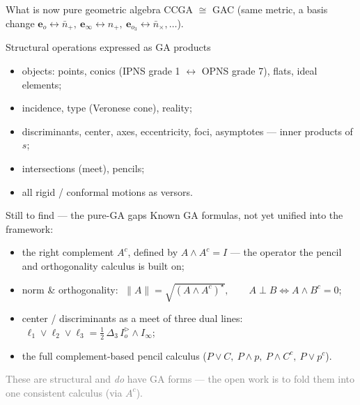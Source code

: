 \documentclass[aspectratio=169, 10pt]{beamer}
\newcommand{\eo}{\mathbf{e}_o}
\newcommand{\einff}{\mathbf{e}_\infty}
\newcommand{\eoi}[1]{\mathbf{e}_{o_{#1}}}
\newcommand{\Iod}{I_o^{\triangleright}}
\newcommand{\Iinf}{I_\infty}
\newcommand{\wed}{\wedge}
\newcommand{\meet}{\vee}
\begin{document}
\begin{frame}[t]{What is now pure geometric algebra}
  CCGA $\cong$ GAC (same metric, a basis change
  $\eo\!\leftrightarrow\!\bar n_+,\ \einff\!\leftrightarrow\! n_+,\ \eoi3\!\leftrightarrow\!\bar n_\times,\dots$).
  \vspace{0.4cm}
  \begin{exampleblock}{Structural operations expressed as GA products}
    \begin{itemize}\setlength\itemsep{0.25em}
      \item objects: points, conics (IPNS grade 1 $\leftrightarrow$ OPNS grade 7), flats, ideal elements;
      \item \alert{incidence}, \alert{type} (Veronese cone), reality;
      \item discriminants, \alert{center}, axes, eccentricity, foci, asymptotes --- inner products of $s$;
      \item intersections (meet), \alert{pencils};
      \item all rigid / conformal motions as versors.
    \end{itemize}
  \end{exampleblock}
\end{frame}

\begin{frame}[t]{Still to find --- the pure-GA gaps}
  Known GA formulas, not yet \alert{unified} into the framework:
  \vspace{0.3cm}
  \begin{itemize}\setlength\itemsep{0.5em}
    \item the right \alert{complement} $A^c$, defined by $A\wed A^c = I$ --- the operator the
          pencil and orthogonality calculus is built on;
    \item \alert{norm \& orthogonality}:
          $\;\lVert A\rVert=\sqrt{(A\wed A^c)^\star},\qquad A\perp B \iff A\wed B^c=0$;
    \item \alert{center / discriminants as a meet of three dual lines}:
          $\;\ell_1\meet\ell_2\meet\ell_3=\tfrac12\,\Delta_3\,\Iod\wed\Iinf$;
    \item the full complement-based \alert{pencil calculus}
          ($P\meet C,\ P\wed p,\ P\wed C^c,\ P\meet p^c$).
  \end{itemize}
  \vspace{0.3cm}
  \textcolor{gray}{These are structural and \emph{do} have GA forms --- the open work is to fold them into one consistent calculus (via $A^c$).}
\end{frame}
\end{document}
